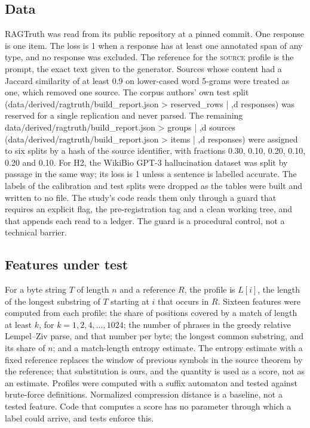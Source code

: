\documentclass[11pt]{article}
\newcommand{\arm}[1]{\textsc{#1}}
\begin{document}
\subsection*{Data}
RAGTruth\cite{ragtruth} was read from its public repository at a pinned commit. One response is one item. The loss is 1 when a response has at least one annotated span of any type, and no response was excluded. The reference for the \arm{source} profile is the prompt, the exact text given to the generator. Sources whose content had a Jaccard similarity of at least 0.9 on lower-cased word 5-grams were treated as one, which removed one source. The corpus authors' own test split ({{data/derived/ragtruth/build_report.json > reserved_rows | ,d}} responses) was reserved for a single replication and never parsed. The remaining {{data/derived/ragtruth/build_report.json > groups | ,d}} sources ({{data/derived/ragtruth/build_report.json > items | ,d}} responses) were assigned to six splits by a hash of the source identifier, with fractions 0.30, 0.10, 0.20, 0.10, 0.20 and 0.10. For H2, the WikiBio GPT-3 hallucination dataset\cite{selfcheck} was split by passage in the same way; its loss is 1 unless a sentence is labelled accurate. The labels of the calibration and test splits were dropped as the tables were built and written to no file. The study's code reads them only through a guard that requires an explicit flag, the pre-registration tag and a clean working tree, and that appends each read to a ledger. The guard is a procedural control, not a technical barrier.

\subsection*{Features under test}
For a byte string $T$ of length $n$ and a reference $R$, the profile is $L[i]$, the length of the longest substring of $T$ starting at $i$ that occurs in $R$. Sixteen features were computed from each profile: the share of positions covered by a match of length at least $k$, for $k = 1, 2, 4, \dots, 1024$; the number of phrases in the greedy relative Lempel--Ziv parse\cite{zivmerhav}, and that number per byte; the longest common substring, and its share of $n$; and a match-length entropy estimate\cite{kontoyiannis}. The entropy estimate with a fixed reference replaces the window of previous symbols in the source theorem by the reference; that substitution is ours, and the quantity is used as a score, not as an estimate. Profiles were computed with a suffix automaton\cite{blumer} and tested against brute-force definitions. Normalized compression distance\cite{ncd} is a baseline, not a tested feature. Code that computes a score has no parameter through which a label could arrive, and tests enforce this.
\end{document}
